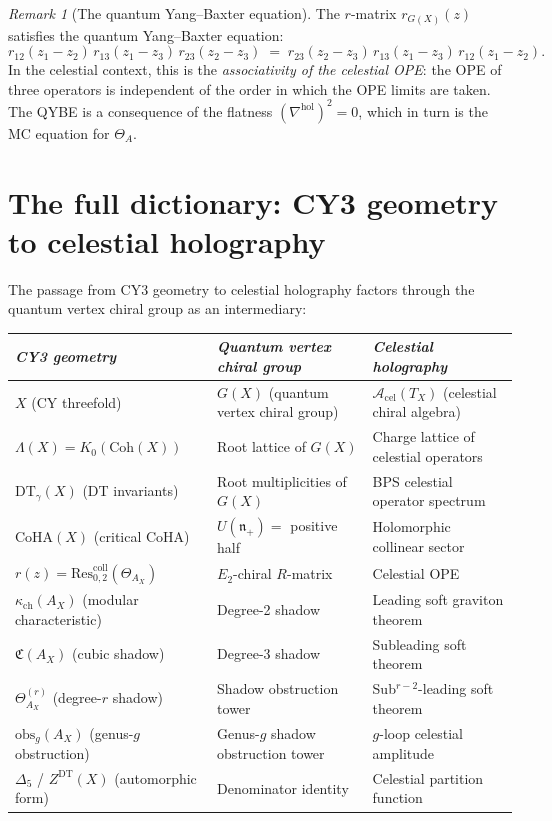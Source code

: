 \documentclass[11pt]{article}
\theoremstyle{definition}
\theoremstyle{remark}
\newtheorem{remark}[theorem]{Remark}
\newcommand{\cA}{\mathcal{A}}
\newcommand{\Res}{\mathrm{Res}}
\newcommand{\Coh}{\mathrm{Coh}}
\newcommand{\CoHA}{\mathrm{CoHA}}
\newcommand{\DT}{\mathrm{DT}}
\begin{document}
\begin{remark}[The quantum Yang--Baxter equation]
\label{rem:qybe-celestial}
The $r$-matrix $r_{G(X)}(z)$ satisfies the quantum Yang--Baxter
equation:
\[
r_{12}(z_1 - z_2)\, r_{13}(z_1 - z_3)\, r_{23}(z_2 - z_3)
\;=\;
r_{23}(z_2 - z_3)\, r_{13}(z_1 - z_3)\, r_{12}(z_1 - z_2).
\]
In the celestial context, this is the \emph{associativity of the
celestial OPE}: the OPE of three operators is independent of the
order in which the OPE limits are taken. The QYBE is a consequence
of the flatness $(\nabla^{\mathrm{hol}})^2 = 0$, which in turn is
the MC equation for $\Theta_A$.
\end{remark}

\section{The full dictionary: CY3 geometry to celestial holography}
\label{sec:full-dictionary}

The passage from CY3 geometry to celestial holography factors
through the quantum vertex chiral group as an intermediary:

\begin{center}
\begin{tabular}{p{3cm}p{4cm}p{4.5cm}}
\toprule
\textit{CY3 geometry} &
\textit{Quantum vertex chiral group} &
\textit{Celestial holography} \\
\midrule
$X$ (CY threefold) &
$G(X)$ (quantum vertex chiral group) &
$\cA_{\mathrm{cel}}(T_X)$ (celestial chiral algebra) \\[4pt]
$\Lambda(X) = K_0(\Coh(X))$ &
Root lattice of $G(X)$ &
Charge lattice of celestial operators \\[4pt]
$\DT_\gamma(X)$ (DT invariants) &
Root multiplicities of $G(X)$ &
BPS celestial operator spectrum \\[4pt]
$\CoHA(X)$ (critical CoHA) &
$U(\mathfrak{n}_+) = $ positive half &
Holomorphic collinear sector \\[4pt]
$r(z) = \Res^{\mathrm{coll}}_{0,2}(\Theta_{A_X})$ &
$E_2$-chiral $R$-matrix &
Celestial OPE \\[4pt]
$\kappa_{\mathrm{ch}}(A_X)$ (modular characteristic) &
Degree-2 shadow &
Leading soft graviton theorem \\[4pt]
$\mathfrak{C}(A_X)$ (cubic shadow) &
Degree-3 shadow &
Subleading soft theorem \\[4pt]
$\Theta_{A_X}^{(r)}$ (degree-$r$ shadow) &
Shadow obstruction tower &
Sub$^{r-2}$-leading soft theorem \\[4pt]
$\mathrm{obs}_g(A_X)$ (genus-$g$ obstruction) &
Genus-$g$ shadow obstruction tower &
$g$-loop celestial amplitude \\[4pt]
$\Delta_5$ / $Z^{\DT}(X)$ (automorphic form) &
Denominator identity &
Celestial partition function \\
\bottomrule
\end{tabular}
\end{center}
\end{document}
